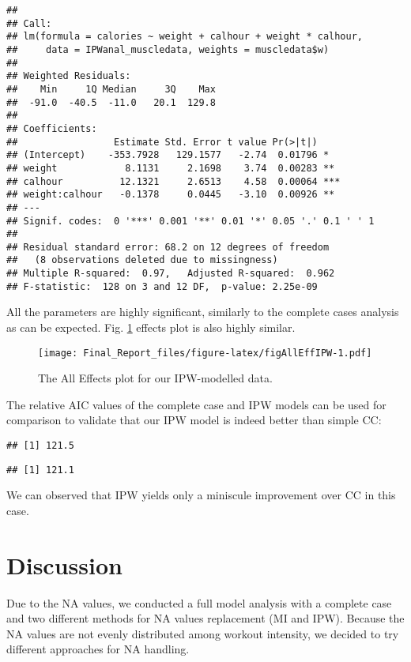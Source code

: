 \documentclass[]{article}
\theoremstyle{definition}
\theoremstyle{definition}
\theoremstyle{definition}
\theoremstyle{remark}
\begin{document}
\begin{verbatim}
## 
## Call:
## lm(formula = calories ~ weight + calhour + weight * calhour, 
##     data = IPWanal_muscledata, weights = muscledata$w)
## 
## Weighted Residuals:
##    Min     1Q Median     3Q    Max 
##  -91.0  -40.5  -11.0   20.1  129.8 
## 
## Coefficients:
##                 Estimate Std. Error t value Pr(>|t|)    
## (Intercept)    -353.7928   129.1577   -2.74  0.01796 *  
## weight            8.1131     2.1698    3.74  0.00283 ** 
## calhour          12.1321     2.6513    4.58  0.00064 ***
## weight:calhour   -0.1378     0.0445   -3.10  0.00926 ** 
## ---
## Signif. codes:  0 '***' 0.001 '**' 0.01 '*' 0.05 '.' 0.1 ' ' 1
## 
## Residual standard error: 68.2 on 12 degrees of freedom
##   (8 observations deleted due to missingness)
## Multiple R-squared:  0.97,   Adjusted R-squared:  0.962 
## F-statistic:  128 on 3 and 12 DF,  p-value: 2.25e-09
\end{verbatim}

All the parameters are highly significant, similarly to the complete
cases analysis as can be expected. Fig. \ref{fig:AllEffIPW} effects plot
is also highly similar.

\begin{figure}[htbp]
\centering
\texttt{[image: Final\_Report\_files/figure-latex/figAllEffIPW-1.pdf]}
\caption{\label{fig:figAllEffIPW}\label{fig:AllEffIPW}The All Effects plot
for our IPW-modelled data.}
\end{figure}

The relative AIC values of the complete case and IPW models can be used
for comparison to validate that our IPW model is indeed better than
simple CC:

\begin{verbatim}
## [1] 121.5
\end{verbatim}

\begin{verbatim}
## [1] 121.1
\end{verbatim}

We can observed that IPW yields only a miniscule improvement over CC in
this case.

\section{Discussion}\label{discussion}

Due to the NA values, we conducted a full model analysis with a complete
case and two different methods for NA values replacement (MI and IPW).
Because the NA values are not evenly distributed among workout
intensity, we decided to try different approaches for NA handling.
\end{document}
